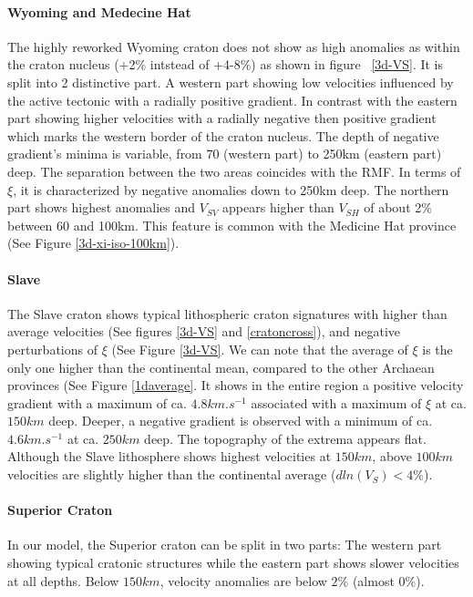 \documentclass[12pt]{article}
\begin{document}
		\paragraph{Wyoming and Medecine Hat}
			The highly reworked Wyoming craton does not show as high anomalies as within the craton nucleus (+2\% intstead of +4-8\%) as shown in figure ~\ref{3d-VS}. 
			It is split into 2 distinctive part. A western part showing low velocities influenced by the active tectonic with a radially positive gradient. 
			In contrast with the eastern part showing higher velocities with a radially negative then positive gradient which marks the western border of the craton nucleus. 
			The depth of negative gradient's minima is variable, from 70 (western part) to 250km (eastern part) deep. 
			The separation between the two areas coincides with the RMF.
			In terms of $\xi$, it is characterized by negative anomalies down to 250km deep. 
			The northern part shows highest anomalies and $V_{SV}$ appears higher than $V_{SH}$ of about 2\% between 60 and 100km. This feature is common with the Medicine Hat province (See Figure \ref{3d-xi-iso-100km}).

		\paragraph{Slave}
			The Slave craton shows typical lithospheric craton signatures with higher than average velocities (See figures \ref{3d-VS} and \ref{cratoncross}), and negative perturbations of $\xi$ (See Figure \ref{3d-VS}. 
			We can note that the average of $\xi$ is the only one higher than the continental mean, compared to the other Archaean provinces (See Figure \ref{1daverage}.
			It shows in the entire region a positive velocity gradient with a maximum of ca. $4.8km.s^{-1}$ associated with a maximum of $\xi$ at ca. $150km$ deep. 
			Deeper, a negative gradient is observed with a minimum of ca. $4.6km.s^{-1}$ at ca. $250km$ deep. 
			The topography of the extrema appears flat.
			Although the Slave lithosphere shows highest velocities at $150km$, above $100km$ velocities are slightly higher than the continental average ($dln(V_S)< 4\%$).

		\paragraph{Superior Craton}
			In our model, the Superior craton can be split in two parts: The western part showing typical cratonic structures while the eastern part shows slower velocities at all depths. Below $150km$, velocity anomalies are below $2\%$ (almost $0\%$). 
\end{document}
